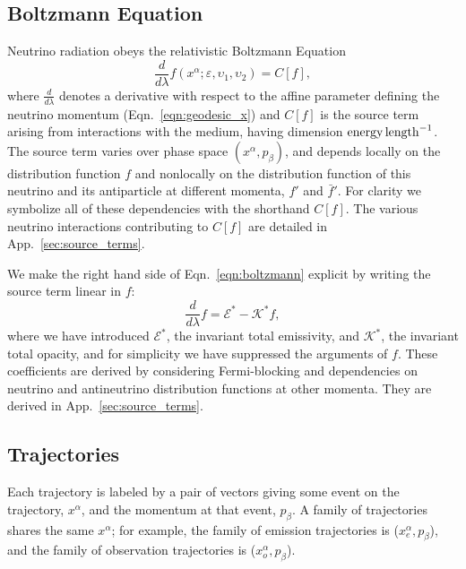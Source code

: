 \documentclass[aps,floatfix,prd,superscriptaddress,twocolumn]{revtex4-1}
\newcommand{\todo}[1]{\marginpar{\tiny{\textcolor{red}{#1}}}}
\begin{document}
\subsection{Boltzmann Equation}
\label{ssec:boltzmann}
Neutrino radiation obeys the relativistic Boltzmann Equation
\todo{point out limit of QKEs}
\begin{equation}
  \label{eqn:boltzmann}
  \frac{d}{d\lambda}f(x^\alpha;\varepsilon,\upsilon_1,\upsilon_2) = C[f],
\end{equation}
where $\frac{d}{d\lambda}$ denotes a derivative with respect to the affine
parameter defining the neutrino momentum (Eqn.~\ref{eqn:geodesic_x})
and $C[f]$ is the source term arising from interactions with the medium,
having dimension ${\rm energy}\,{\rm length}^{-1}$.
The source term varies over phase space $(x^\alpha,p_\beta)$,
and depends locally on the distribution function $f$
and nonlocally on the distribution function of this neutrino and its
antiparticle at different momenta, $f'$ and $\bar{f}'$.
For clarity we symbolize all of these dependencies with the shorthand $C[f]$.
The various neutrino interactions contributing to $C[f]$ are detailed in
App.~\ref{sec:source_terms}.

We make the right hand side of Eqn.~\ref{eqn:boltzmann} explicit by writing
the source term linear in $f$:
\begin{equation}
  \label{eqn:boltzmann_linear}
  \frac{d}{d\lambda}f =
  \mathscr{E}^* - \mathscr{K}^* f,
\end{equation}
where we have introduced
$\mathscr{E}^*$, the invariant total emissivity, and
$\mathscr{K}^*$, the invariant total opacity,
and for simplicity we have suppressed the arguments of $f$.
These coefficients are derived by considering Fermi-blocking and
dependencies on neutrino and antineutrino distribution functions at other
momenta.
They are derived in App.~\ref{sec:source_terms}.

\subsection{Trajectories}
\label{ssec:trajectories}
Each trajectory is labeled by a pair of vectors
giving some event on the trajectory, $x^\alpha$,
and the momentum at that event, $p_\beta$.
A family of trajectories shares the same $x^\alpha$; for example,
the family of emission trajectories is ($x^\alpha_e,p_\beta$),
and the family of observation trajectories is ($x^\alpha_o,p_\beta$).
\end{document}
